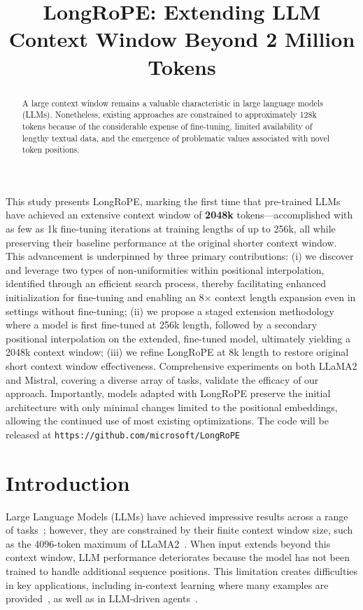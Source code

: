\title{LongRoPE: Extending LLM Context Window Beyond 2 Million Tokens}

\begin{abstract}
A large context window remains a valuable characteristic in large language models (LLMs). Nonetheless, existing approaches are constrained to approximately 128k tokens because of the considerable expense of fine-tuning, limited availability of lengthy textual data, and the emergence of problematic values associated with novel token positions.
\end{abstract}

This study presents LongRoPE, marking the first time that pre-trained LLMs have achieved an extensive context window of \textbf{2048k} tokens—accomplished with as few as 1k fine-tuning iterations at training lengths of up to 256k, all while preserving their baseline performance at the original shorter context window. This advancement is underpinned by three primary contributions: (i) we discover and leverage two types of non-uniformities within positional interpolation, identified through an efficient search process, thereby facilitating enhanced initialization for fine-tuning and enabling an 8$\times$ context length expansion even in settings without fine-tuning; (ii) we propose a staged extension methodology where a model is first fine-tuned at 256k length, followed by a secondary positional interpolation on the extended, fine-tuned model, ultimately yielding a 2048k context window; (iii) we refine LongRoPE at 8k length to restore original short context window effectiveness. Comprehensive experiments on both LLaMA2 and Mistral, covering a diverse array of tasks, validate the efficacy of our approach. Importantly, models adapted with LongRoPE preserve the initial architecture with only minimal changes limited to the positional embeddings, allowing the continued use of most existing optimizations. The code will be released at \texttt{https://github.com/microsoft/LongRoPE}

\section{Introduction}

Large Language Models (LLMs) have achieved impressive results across a range of tasks~\cite{gpt4,llama2}; however, they are constrained by their finite context window size, such as the 4096-token maximum of LLaMA2~\cite{llama2}. When input extends beyond this context window, LLM performance deteriorates because the model has not been trained to handle additional sequence positions. This limitation creates difficulties in key applications, including in-context learning where many examples are provided~\cite{Huang2023FewerIM}, as well as in LLM-driven agents~\cite{park2023generative,madaan2023selfrefine}.

